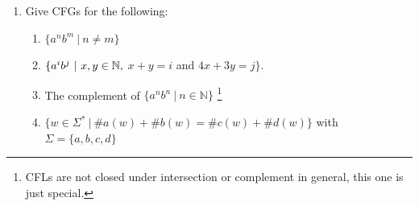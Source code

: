 \documentclass[11pt]{article}
\begin{document}
\begin{enumerate}
\vspace{1em}    

\item Give CFGs for the following:
    \begin{enumerate}
        \item $\{a^nb^m~|~ n\neq m\}$     
    
    \begin{answer}
    \end{answer}
        \item $\{a^ib^j~|~x,y \in {\mathbb N}, $ $x+y = i$ and $4x+3y = j\}$.    
    
    \begin{answer}
    \end{answer}
        \item The complement of $\{a^nb^n ~|~ n \in \mathbb{N}\}$ \footnote{CFLs are not closed under intersection or complement in general, this one is just special.}  
        
    \begin{answer}
    \end{answer}
        \item $\{w \in \Sigma^*~|~ \#a(w)+\#b(w) = \#c(w)+\#d(w)\}$ with $\Sigma = \{a,b,c,d\}$    
    
    \begin{answer}
    \end{answer}
    \end{enumerate}

  


\vspace{1em}    
\end{enumerate}
\end{document}
